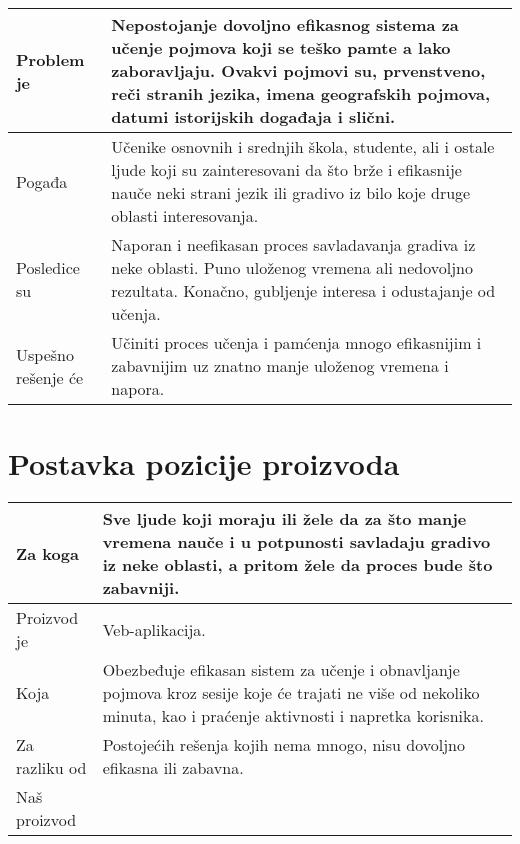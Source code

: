 \begin{center}
    \begin{tabular}{|>{\columncolor[gray]{0.8}}m{2cm}|m{6cm}|}
        \hline
        Problem je &
        Nepostojanje dovoljno efikasnog sistema za učenje pojmova koji se teško pamte a lako zaboravljaju.
        Ovakvi pojmovi su, prvenstveno, reči stranih jezika, imena geografskih pojmova, datumi istorijskih događaja i slični.\\
        \hline
        Pogađa &
        Učenike osnovnih i srednjih škola, studente, ali i ostale ljude koji su zainteresovani da što brže i efikasnije nauče neki strani jezik ili gradivo iz bilo koje druge oblasti interesovanja.\\
        \hline
        Posledice su &
        Naporan i neefikasan proces savladavanja gradiva iz neke oblasti.
        Puno uloženog vremena ali nedovoljno rezultata.
        Konačno, gubljenje interesa i odustajanje od učenja.\\
        \hline
        Uspešno rešenje će &
        Učiniti proces učenja i pamćenja mnogo efikasnijim i zabavnijim uz znatno manje uloženog vremena i napora.\\
        \hline
    \end{tabular}
\end{center}

\section{Postavka pozicije proizvoda}

\begin{center}
    \begin{tabular}{|>{\columncolor[gray]{0.8}}m{2cm}|m{6cm}|}
        \hline
        Za koga &
        Sve ljude koji moraju ili žele da za što manje vremena nauče i u potpunosti savladaju gradivo iz neke oblasti, a pritom žele da proces bude što zabavniji.\\
        \hline
        Proizvod je &
        Veb-aplikacija.\\
        \hline
        Koja &
        Obezbeđuje efikasan sistem za učenje i obnavljanje pojmova kroz sesije koje će trajati ne više od nekoliko minuta, kao i praćenje aktivnosti i napretka korisnika.\\
        \hline
        Za razliku od &
        Postojećih rešenja kojih nema mnogo, nisu dovoljno efikasna ili zabavna.\\
        \hline
        Naš proizvod &
        \\
        \hline
    \end{tabular}
\end{center}

